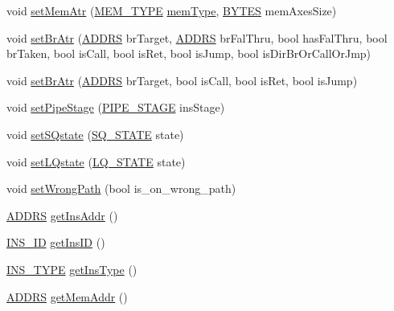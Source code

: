 \begin{DoxyCompactItemize}
\item 
void \hyperlink{classdynInstruction_a2608f4e8ea89c4ea370f0dab131d78ba}{setMemAtr} (\hyperlink{global_2global_8h_a40bc49627faaf5adeed28388c6ffae9c}{MEM\_\-TYPE} \hyperlink{binaryTranslator_2global_8h_a94b8423a23b95a7adac22848b81e7c0c}{memType}, \hyperlink{global_2global_8h_a430d9e51ff815ddfce06905ae7392e83}{BYTES} memAxesSize)
\item 
void \hyperlink{classdynInstruction_ac71f51f5c4f207d4993acdfc0a2abbc1}{setBrAtr} (\hyperlink{global_2global_8h_a7ea74bb9ffd2e4d41550ae2383dd25bc}{ADDRS} brTarget, \hyperlink{global_2global_8h_a7ea74bb9ffd2e4d41550ae2383dd25bc}{ADDRS} brFalThru, bool hasFalThru, bool brTaken, bool isCall, bool isRet, bool isJump, bool isDirBrOrCallOrJmp)
\item 
void \hyperlink{classdynInstruction_a4d1879c3a2a4170fb103932044dc863f}{setBrAtr} (\hyperlink{global_2global_8h_a7ea74bb9ffd2e4d41550ae2383dd25bc}{ADDRS} brTarget, bool isCall, bool isRet, bool isJump)
\item 
void \hyperlink{classdynInstruction_a0cb15d906e84b2efc8986b74edaf5adf}{setPipeStage} (\hyperlink{global_2global_8h_a015eb90e0de9f16e87bd149d4b9ce959}{PIPE\_\-STAGE} insStage)
\item 
void \hyperlink{classdynInstruction_a7fc66de5e3f826f515e41029619e2088}{setSQstate} (\hyperlink{global_2global_8h_af9e953470c71a91625fe1fc66f2dc49b}{SQ\_\-STATE} state)
\item 
void \hyperlink{classdynInstruction_a83a5077984f29a340de7bebc7e0b679c}{setLQstate} (\hyperlink{global_2global_8h_a49734aedeaf1d3f1c93c4778b3b62205}{LQ\_\-STATE} state)
\item 
void \hyperlink{classdynInstruction_a794898f3f2f9a99de5f8ca4b8f8999c4}{setWrongPath} (bool is\_\-on\_\-wrong\_\-path)
\item 
\hyperlink{global_2global_8h_a7ea74bb9ffd2e4d41550ae2383dd25bc}{ADDRS} \hyperlink{classdynInstruction_a464da2601438384a3c00e85a814c3964}{getInsAddr} ()
\item 
\hyperlink{global_2global_8h_a1883c47d0023d0f200e1d86eced6a070}{INS\_\-ID} \hyperlink{classdynInstruction_ab38b8181f522daae77cb46d701fb5302}{getInsID} ()
\item 
\hyperlink{binaryTranslator_2global_8h_a7aead736a07eaf25623ad7bfa1f0ee2d}{INS\_\-TYPE} \hyperlink{classdynInstruction_a3a7025de98c539d8eaa06b40ac2e8cc8}{getInsType} ()
\item 
\hyperlink{global_2global_8h_a7ea74bb9ffd2e4d41550ae2383dd25bc}{ADDRS} \hyperlink{classdynInstruction_a611e3f3619160361cf317e05d2034288}{getMemAddr} ()

\end{DoxyCompactItemize}
